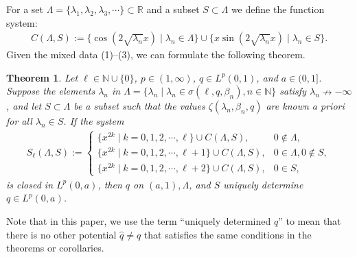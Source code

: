 \documentclass[reqno,12pt,centertags]{amsart}
\numberwithin{equation}{section}
\newtheorem{theorem}{Theorem}[section]
\theoremstyle{definition}
\begin{document}
For a set $\Lambda=\{\lambda_{1}, \lambda_{2}, \lambda_{3}, \cdots\} \subset \mathbb{R}$ and a subset $S \subset \Lambda$ we define the function system:
\begin{align*}
C(\Lambda, S)
:=\{\cos(2\sqrt{\lambda_n}x)\mid\lambda_n\in\Lambda\} 
\cup\{x\sin(2\sqrt{\lambda_n}x)\mid\lambda_n\in S\}.
\end{align*}
Given the mixed data (1)--(3), we can formulate the following theorem.

\begin{theorem}\label{t4.1}
Let $\ell\in \mathbb{N}\cup\{0\}$, $p\in(1, \infty)$, $q\in L^p(0,1)$, and $a \in(0,1]$. 
Suppose the elements $\lambda_n$ in
$\Lambda
=\{\lambda_{n}\mid\lambda_{n}\in\sigma(\ell, q, \beta_n), 
n\in\mathbb{N}\}$ 
satisfy $\lambda_n \nrightarrow -\infty$, and let $S \subset \Lambda$ be a subset such that the values $\zeta(\lambda_n, \beta_n, q)$ are known a priori for all $\lambda_n \in S$.
If the system
\begin{align*}
S_{\ell}(\Lambda,S)
:= 
\begin{cases}
\{x^{2k}\mid k=0,1,2,\cdots,\ell\}\cup C(\Lambda, S), 
& 0 \notin \Lambda, \\ 
\{x^{2k}\mid k=0,1,2,\cdots,\ell+1\}\cup C(\Lambda, S), 
& 0 \in \Lambda, 0\notin S, \\ 
\{x^{2k}\mid k=0,1,2,\cdots,\ell+2\}\cup C(\Lambda, S), 
& 0 \in S,
\end{cases}
\end{align*}
is closed in $L^p(0, a)$, then $q$ on $(a, 1), \Lambda$, and $S$ uniquely determine $q \in L^p(0, a)$.
\end{theorem}

Note that in this paper, we use the term “uniquely determined $q$” to mean that there is no other potential $\hat{q} \neq q$ that satisfies the same conditions in the theorems or corollaries.
\end{document}
